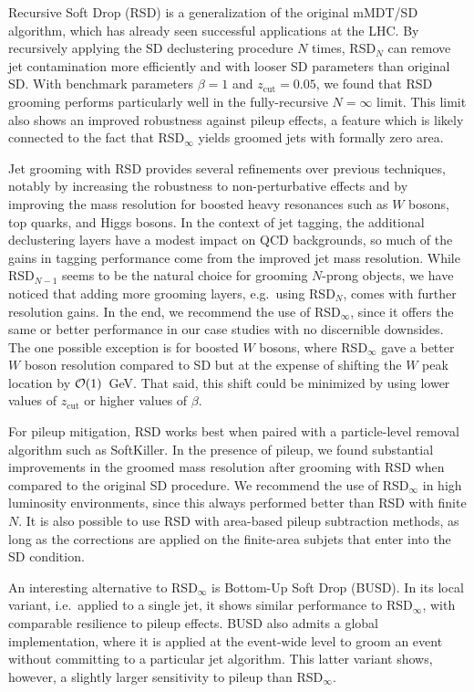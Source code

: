 \documentclass[11pt,a4paper]{article}
\newcommand{\zcut}{z_\text{cut}}
\begin{document}
Recursive Soft Drop (RSD) is a generalization of the original mMDT/SD
algorithm, which has already seen successful applications at the LHC.
%
By recursively applying the SD declustering procedure $N$ times,
RSD$_N$ can remove jet contamination more efficiently and with looser
SD parameters than original SD.
%
With benchmark parameters $\beta=1$ and $\zcut=0.05$, we found that RSD grooming performs particularly well in the fully-recursive $N=\infty$ limit.
%
This limit also shows an improved robustness against pileup effects, a
feature which is likely connected to the fact that RSD$_\infty$ yields
groomed jets with formally zero area.

Jet grooming with RSD provides several refinements over previous techniques, notably by increasing the robustness to
non-perturbative effects and by improving the mass resolution for boosted heavy resonances such as $W$ bosons, top quarks, and Higgs bosons.
%
In the context of jet tagging, the additional declustering layers have
a modest impact on QCD backgrounds, so much of the gains in tagging
performance come from the improved jet mass resolution.
%
While RSD$_{N-1}$ seems to be the natural choice for grooming $N$-prong objects, we have
noticed that adding more grooming layers, e.g.\ using RSD$_N$, comes with further resolution gains.
%
In the end, we recommend the use of RSD$_\infty$, since it offers the same or better performance in our case studies with no discernible downsides.
%
The one possible
exception is for boosted $W$ bosons, where RSD$_\infty$ gave a better
$W$ boson resolution compared to SD but at the expense of shifting the $W$ peak
location by ${\cal{O}}(1)$~GeV.
%
That said, this shift could be minimized by using lower values of $\zcut$ or higher values of $\beta$.

For pileup mitigation, RSD works best when paired with a particle-level removal algorithm such as SoftKiller.
%
In the presence of pileup, we found substantial improvements in the groomed mass resolution after grooming with RSD when compared
to the original SD procedure.
%
We recommend the use of RSD$_\infty$ in high luminosity environments,
since this always performed better than RSD with finite $N$.
%
It is also possible to use RSD with area-based pileup subtraction methods, as long as the corrections are applied on the finite-area subjets that enter into the SD condition.

An interesting alternative to RSD$_\infty$ is Bottom-Up Soft Drop
(BUSD).
%
In its local variant, i.e.\ applied to a single jet, it shows
similar performance to RSD$_\infty$, with comparable resilience
to pileup effects.
%
BUSD also admits a global implementation, where it
is applied at the event-wide level to groom an event without
committing to a particular jet algorithm.
%
This latter variant shows,
however, a slightly larger sensitivity to pileup than RSD$_\infty$.
\end{document}
